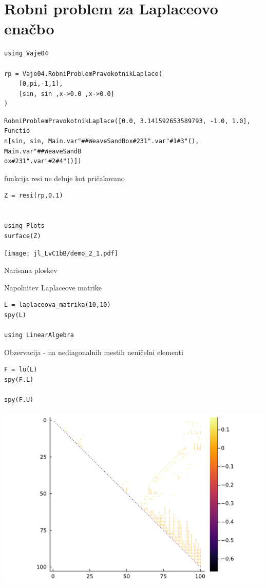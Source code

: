 \documentclass[12pt,a4paper]{article}
\begin{document}
\section{Robni problem za Laplaceovo enačbo}

\begin{verbatim}
using Vaje04

rp = Vaje04.RobniProblemPravokotnikLaplace(
    [0,pi,-1,1],
    [sin, sin ,x->0.0 ,x->0.0]
)
\end{verbatim}
\begin{verbatim}
RobniProblemPravokotnikLaplace([0.0, 3.141592653589793, -1.0, 1.0], Functio
n[sin, sin, Main.var"##WeaveSandBox#231".var"#1#3"(), Main.var"##WeaveSandB
ox#231".var"#2#4"()])
\end{verbatim}

funkcija resi ne deluje kot pričakovano


\begin{verbatim}
Z = resi(rp,0.1)


using Plots
surface(Z)
\end{verbatim}
\texttt{[image: jl\_LvC1bB/demo\_2\_1.pdf]}

Narisana ploskev


Napolnitev Laplaceove matrike


\begin{verbatim}
L = laplaceova_matrika(10,10)
spy(L)

using LinearAlgebra
\end{verbatim}

Obzervacija - na nediagonalnih mestih neničelni elementi


\begin{verbatim}
F = lu(L)
spy(F.L)

spy(F.U)
\end{verbatim}
\includegraphics[width=\linewidth]{jl_LvC1bB/demo_4_1.pdf}
\end{document}
